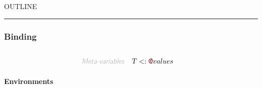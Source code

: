 


    OUTLINE
  \tableofcontents
\begin{center}
\rule{3in}{0.4pt}
\end{center}

\subsubsection{Binding}\hypertarget{binding}{}\label{binding}

\begin{align*}
  [ \
  \KEY{Type} \quad & \FUN@environments \\
  \KEY{Alias} \quad & \FUN@envs \\
  \KEY{Datatype} \quad & \FUN@identifiers \\
  \KEY{Alias} \quad & \FUN@ids \\
  \KEY{Funcon} \quad & \FUN@identifier@tagged \\
  \KEY{Alias} \quad & \FUN@id@tagged \\
  \KEY{Funcon} \quad & \FUN@fresh@identifier \\
  \KEY{Entity} \quad & \FUN@environment \\
  \KEY{Alias} \quad & \FUN@env \\
  \KEY{Funcon} \quad & \FUN@initialise@binding \\
  \KEY{Funcon} \quad & \FUN@bind@value \\
  \KEY{Alias} \quad & \FUN@bind \\
  \KEY{Funcon} \quad & \FUN@unbind \\
  \KEY{Funcon} \quad & \FUN@bound@directly \\
  \KEY{Funcon} \quad & \FUN@bound@value \\
  \KEY{Alias} \quad & \FUN@bound \\
  \KEY{Funcon} \quad & \FUN@closed \\
  \KEY{Funcon} \quad & \FUN@scope \\
  \KEY{Funcon} \quad & \FUN@accumulate \\
  \KEY{Funcon} \quad & \FUN@collateral \\
  \KEY{Funcon} \quad & \FUN@bind@recursively \\
  \KEY{Funcon} \quad & \FUN@recursive
  \ ]
\end{align*}
\begin{align*}
  \KEY{Meta-variables} \quad
  & \VAR{T} <: \FUN@values
\end{align*}
\paragraph{Environments}\hypertarget{environments}{}\label{environments}

